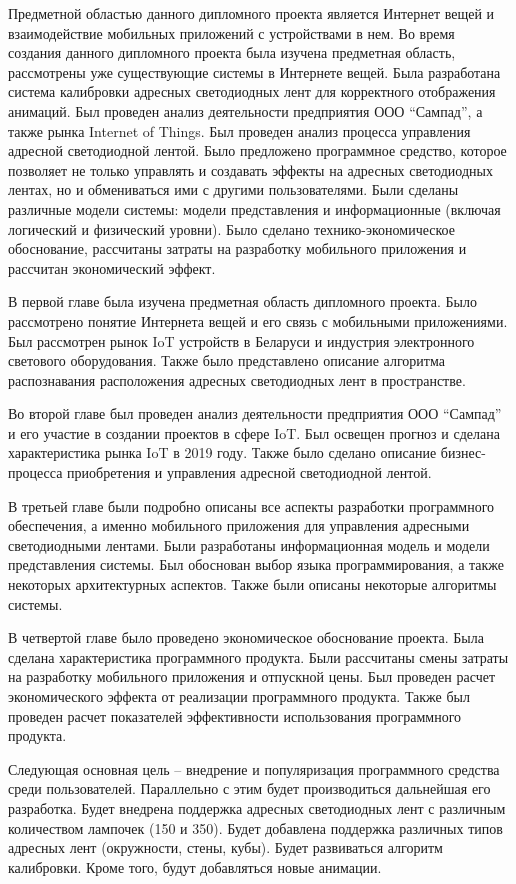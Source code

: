 Предметной областью данного дипломного проекта является Интернет вещей и взаимодействие мобильных приложений с устройствами в нем. Во время создания данного дипломного проекта была изучена предметная область, рассмотрены уже существующие системы в Интернете вещей. Была разработана система калибровки адресных светодиодных лент для корректного отображения анимаций. Был проведен анализ деятельности предприятия ООО \enquote{Сампад}, а также рынка Internet of Things. Был проведен анализ процесса управления адресной светодиодной лентой. Было предложено программное средство, которое позволяет не только управлять и создавать эффекты на адресных светодиодных лентах, но и обмениваться ими с другими пользователями. Были сделаны различные модели системы: модели представления и информационные (включая логический и физический уровни). Было сделано технико-экономическое обоснование, рассчитаны затраты на разработку мобильного приложения и рассчитан экономический эффект.

В первой главе была изучена предметная область дипломного проекта. Было рассмотрено понятие Интернета вещей и его связь с мобильными приложениями. Был рассмотрен рынок IoT устройств в Беларуси и индустрия электронного светового оборудования. Также было представлено описание алгоритма распознавания расположения адресных светодиодных лент в пространстве.

Во второй главе был проведен анализ деятельности предприятия ООО \enquote{Сампад} и его участие в создании проектов в сфере IoT. Был освещен прогноз и сделана характеристика рынка IoT в 2019 году. Также было сделано описание бизнес-процесса приобретения и управления адресной светодиодной лентой.

В третьей главе были подробно описаны все аспекты разработки программного обеспечения, а именно мобильного приложения для управления адресными светодиодными лентами. Были разработаны информационная модель и модели представления системы. Был обоснован выбор языка программирования, а также некоторых архитектурных аспектов. Также были описаны некоторые алгоритмы системы.

В четвертой главе было проведено экономическое обоснование проекта. Была сделана характеристика программного продукта. Были рассчитаны смены затраты на разработку мобильного приложения и отпускной цены. Был проведен расчет экономического эффекта от реализации программного продукта. Также был проведен расчет показателей эффективности использования программного продукта.

Следующая основная цель -- внедрение и популяризация программного средства среди пользователей. Параллельно с этим будет производиться дальнейшая его разработка. Будет внедрена поддержка адресных светодиодных лент с различным количеством лампочек (150 и 350). Будет добавлена поддержка различных типов адресных лент (окружности, стены, кубы). Будет развиваться алгоритм калибровки. Кроме того, будут добавляться новые анимации.

